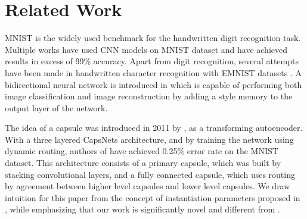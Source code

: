 \section{Related Work}
\label{sect:related}
MNIST \cite{lecun1998mnist} is the widely used benchmark for the handwritten digit recognition task. Multiple works \cite{article,DBLP:journals/corr/abs-1202-2745,4668644,Ranzato:2006:ELS:2976456.2976599,5459469} have used CNN models on MNIST dataset and have achieved results in excess of 99\% accuracy. 
Apart from digit recognition, several attempts \cite{2017arXiv170205373C,2017arXiv170909161D} have been made in handwritten character recognition with EMNIST datasets \cite{2017arXiv170205373C}.
A bidirectional neural network is introduced in \cite{DBLP:journals/corr/abs-1803-01900} which is capable of performing both image classification and image reconstruction by adding a style memory to the output layer of the network. 

The idea of a capsule was introduced in 2011 by \cite{hinton2011transforming}, as a transforming autoencoder. With a three layered CapsNets architecture, and by training the network using dynamic routing, authors of \cite{sabour2017dynamic} have achieved 0.25\% error rate on the MNIST dataset. This architecture consists of a primary capsule, which was built by stacking convolutional layers, and a fully connected capsule, which uses routing by agreement between higher level capsules and lower level capsules. We draw intuition for this paper from the concept of instantiation parameters proposed in \cite{hinton2011transforming}, while emphasizing that our work is significantly novel and different from \cite{hinton2011transforming}.


